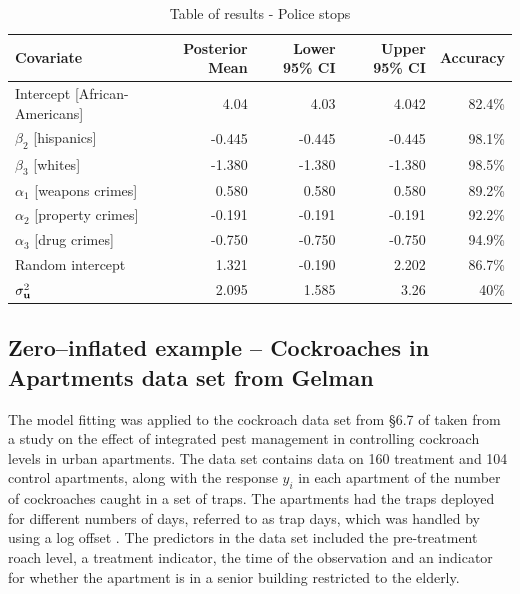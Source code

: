 \documentclass{amsart}[12pt]
\begin{document}
			\begin{table}
				\caption{Table of results - Police stops}
				\label{tab:application_police_stops}
				\begin{tabular}{|l|rrrr|}
					\hline
					Covariate                     & Posterior Mean & Lower 95\% CI & Upper 95\% CI & Accuracy \\
					\hline
					Intercept [African-Americans] & 4.04           & 4.03          & 4.042         & 82.4\%   \\
					$\beta_2$ [hispanics]         & -0.445         & -0.445        & -0.445        & 98.1\%   \\
					$\beta_3$ [whites]            & -1.380         & -1.380        & -1.380        & 98.5\%   \\
					$\alpha_1$ [weapons crimes]   & 0.580          & 0.580         & 0.580         & 89.2\%   \\
					$\alpha_2$ [property crimes]  & -0.191         & -0.191        & -0.191        & 92.2\%   \\
					$\alpha_3$ [drug crimes]      & -0.750         & -0.750        & -0.750        & 94.9\%   \\
					Random intercept              & 1.321          & -0.190        & 2.202         & 86.7\%   \\
					$\sigma^2_{{\bf u}}$              & 2.095          & 1.585         & 3.26          & 40\%     \\
					\hline
				\end{tabular}
			\end{table}
			
			
			
			\subsection{Zero--inflated example -- Cockroaches in Apartments data set from Gelman}
			The model fitting was applied to the cockroach data set from \S 6.7 of \citep{Gelman2007} taken from a study
			on the effect of integrated pest management in controlling cockroach levels in urban apartments. The data
			set contains data on 160 treatment and 104 control apartments, along with the response $y_i$ in each
			apartment of the number of cockroaches caught in a set of traps. The apartments had the traps deployed for
			different numbers of days, referred to as trap days, which was handled by using a log offset
			\citep{Agresti2002}. The predictors in the data set included the pre-treatment roach level, a treatment
			indicator, the time of the observation and an indicator for whether the apartment is in a senior building
			restricted to the elderly.
					
\end{document}
